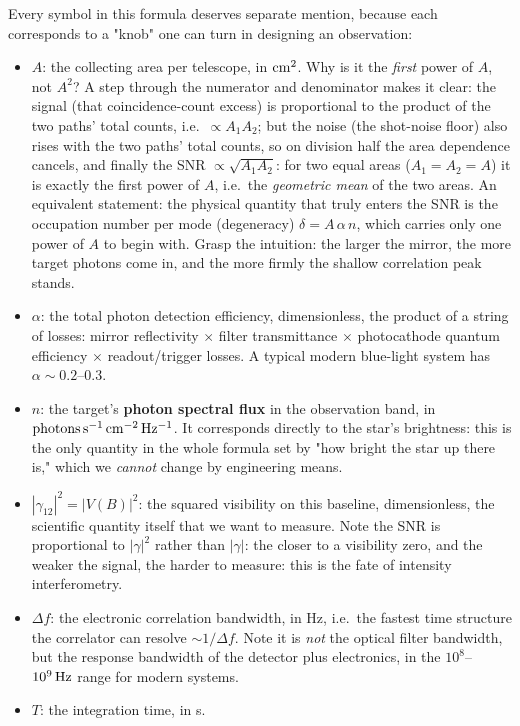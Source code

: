Every symbol in this formula deserves separate mention, because each corresponds to a "knob" one can turn in designing an observation:

\begin{itemize}
  \item \(A\): the collecting area per telescope, in \({\rm cm^2}\). Why is it the \emph{first} power of \(A\), not \(A^2\)? A step through the numerator and denominator makes it clear: the signal (that coincidence-count excess) is proportional to the product of the two paths' total counts, i.e.\ \(\propto A_1 A_2\); but the noise (the shot-noise floor) also rises with the two paths' total counts, so on division half the area dependence cancels, and finally the SNR \(\propto\sqrt{A_1 A_2}\): for two equal areas (\(A_1=A_2=A\)) it is exactly the first power of \(A\), i.e.\ the \emph{geometric mean} of the two areas. An equivalent statement: the physical quantity that truly enters the SNR is the occupation number per mode (degeneracy) \(\delta=A\,\alpha\,n\), which carries only one power of \(A\) to begin with. Grasp the intuition: the larger the mirror, the more target photons come in, and the more firmly the shallow correlation peak stands.
  \item \(\alpha\): the total photon detection efficiency, dimensionless, the product of a string of losses: mirror reflectivity \(\times\) filter transmittance \(\times\) photocathode quantum efficiency \(\times\) readout/trigger losses. A typical modern blue-light system has \(\alpha\sim0.2\)--\(0.3\).
  \item \(n\): the target's \textbf{photon spectral flux} in the observation band, in \({\rm photons\,s^{-1}\,cm^{-2}\,Hz^{-1}}\). It corresponds directly to the star's brightness: this is the only quantity in the whole formula set by "how bright the star up there is," which we \emph{cannot} change by engineering means.
  \item \(|\gamma_{12}|^2=|V(B)|^2\): the squared visibility on this baseline, dimensionless, the scientific quantity itself that we want to measure. Note the SNR is proportional to \(|\gamma|^2\) rather than \(|\gamma|\): the closer to a visibility zero, and the weaker the signal, the harder to measure: this is the fate of intensity interferometry.
  \item \(\Delta f\): the electronic correlation bandwidth, in Hz, i.e.\ the fastest time structure the correlator can resolve \(\sim1/\Delta f\). Note it is \emph{not} the optical filter bandwidth, but the response bandwidth of the detector plus electronics, in the \(10^8\)--\(10^9\,{\rm Hz}\) range for modern systems.
  \item \(T\): the integration time, in s.
\end{itemize}

